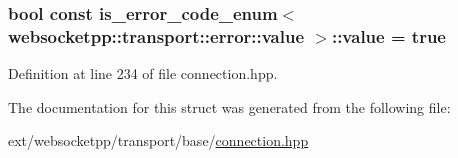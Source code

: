 \subsubsection[{value}]{\setlength{\rightskip}{0pt plus 5cm}bool const is\+\_\+error\+\_\+code\+\_\+enum$<$ {\bf websocketpp\+::transport\+::error\+::value} $>$\+::value = true\hspace{0.3cm}{\ttfamily [static]}}\label{structis__error__code__enum_3_01websocketpp_1_1transport_1_1error_1_1value_01_4_a75058d7048e16ee883f1b54b4e5bcbbf}


Definition at line 234 of file connection.\+hpp.



The documentation for this struct was generated from the following file\+:\begin{DoxyCompactItemize}
\item 
ext/websocketpp/transport/base/\hyperlink{transport_2base_2connection_8hpp}{connection.\+hpp}\end{DoxyCompactItemize}
